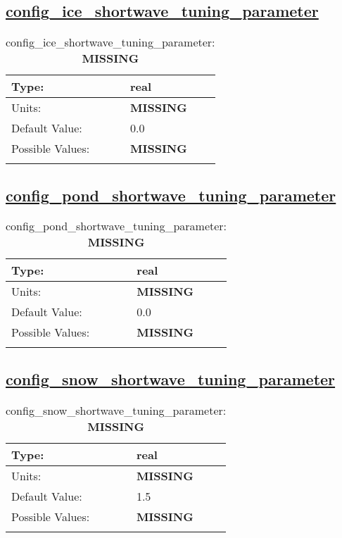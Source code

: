 \subsection[config\_ice\_shortwave\_tuning\_parameter]{\hyperref[sec:nm_tab_shortwave]{config\_ice\_shortwave\_tuning\_parameter}}
\label{subsec:nm_sec_config_ice_shortwave_tuning_parameter}
\begin{center}
\begin{longtable}{| p{2.0in} || p{4.0in} |}
    \hline
    Type: & real \\
    \hline
    Units: & {\bf \color{red} MISSING} \\
    \hline
    Default Value: & 0.0 \\
    \hline
    Possible Values: & {\bf \color{red} MISSING} \\
    \hline
    \caption{config\_ice\_shortwave\_tuning\_parameter: {\bf \color{red} MISSING}}
\end{longtable}
\end{center}
\subsection[config\_pond\_shortwave\_tuning\_parameter]{\hyperref[sec:nm_tab_shortwave]{config\_pond\_shortwave\_tuning\_parameter}}
\label{subsec:nm_sec_config_pond_shortwave_tuning_parameter}
\begin{center}
\begin{longtable}{| p{2.0in} || p{4.0in} |}
    \hline
    Type: & real \\
    \hline
    Units: & {\bf \color{red} MISSING} \\
    \hline
    Default Value: & 0.0 \\
    \hline
    Possible Values: & {\bf \color{red} MISSING} \\
    \hline
    \caption{config\_pond\_shortwave\_tuning\_parameter: {\bf \color{red} MISSING}}
\end{longtable}
\end{center}
\subsection[config\_snow\_shortwave\_tuning\_parameter]{\hyperref[sec:nm_tab_shortwave]{config\_snow\_shortwave\_tuning\_parameter}}
\label{subsec:nm_sec_config_snow_shortwave_tuning_parameter}
\begin{center}
\begin{longtable}{| p{2.0in} || p{4.0in} |}
    \hline
    Type: & real \\
    \hline
    Units: & {\bf \color{red} MISSING} \\
    \hline
    Default Value: & 1.5 \\
    \hline
    Possible Values: & {\bf \color{red} MISSING} \\
    \hline
    \caption{config\_snow\_shortwave\_tuning\_parameter: {\bf \color{red} MISSING}}
\end{longtable}
\end{center}
